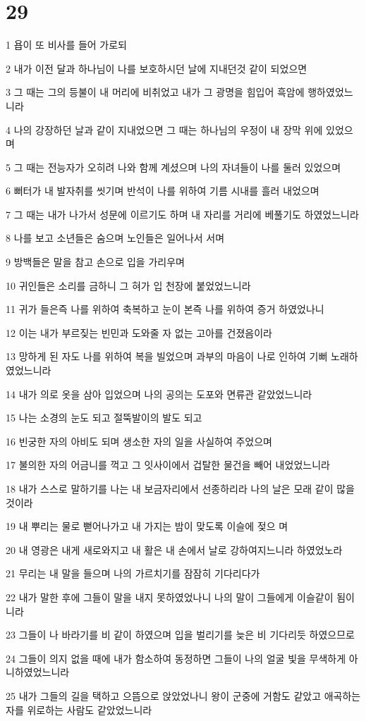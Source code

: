 \chapter{29}

\par 1 욥이 또 비사를 들어 가로되
\par 2 내가 이전 달과 하나님이 나를 보호하시던 날에 지내던것 같이 되었으면
\par 3 그 때는 그의 등불이 내 머리에 비취었고 내가 그 광명을 힘입어 흑암에 행하였었느니라
\par 4 나의 강장하던 날과 같이 지내었으면 그 때는 하나님의 우정이 내 장막 위에 있었으며
\par 5 그 때는 전능자가 오히려 나와 함께 계셨으며 나의 자녀들이 나를 둘러 있었으며
\par 6 뻐터가 내 발자취를 씻기며 반석이 나를 위하여 기름 시내를 흘러 내었으며
\par 7 그 때는 내가 나가서 성문에 이르기도 하며 내 자리를 거리에 베풀기도 하였었느니라
\par 8 나를 보고 소년들은 숨으며 노인들은 일어나서 서며
\par 9 방백들은 말을 참고 손으로 입을 가리우며
\par 10 귀인들은 소리를 금하니 그 혀가 입 천장에 붙었었느니라
\par 11 귀가 들은즉 나를 위하여 축복하고 눈이 본즉 나를 위하여 증거 하였었나니
\par 12 이는 내가 부르짖는 빈민과 도와줄 자 없는 고아를 건졌음이라
\par 13 망하게 된 자도 나를 위하여 복을 빌었으며 과부의 마음이 나로 인하여 기뻐 노래하였었느니라
\par 14 내가 의로 옷을 삼아 입었으며 나의 공의는 도포와 면류관 같았었느니라
\par 15 나는 소경의 눈도 되고 절뚝발이의 발도 되고
\par 16 빈궁한 자의 아비도 되며 생소한 자의 일을 사실하여 주었으며
\par 17 불의한 자의 어금니를 꺽고 그 잇사이에서 겁탈한 물건을 빼어 내었었느니라
\par 18 내가 스스로 말하기를 나는 내 보금자리에서 선종하리라 나의 날은 모래 같이 많을 것이라
\par 19 내 뿌리는 물로 뻗어나가고 내 가지는 밤이 맞도록 이슬에 젖으 며
\par 20 내 영광은 내게 새로와지고 내 활은 내 손에서 날로 강하여지느니라 하였었노라
\par 21 무리는 내 말을 들으며 나의 가르치기를 잠잠히 기다리다가
\par 22 내가 말한 후에 그들이 말을 내지 못하였었나니 나의 말이 그들에게 이슬같이 됨이니라
\par 23 그들이 나 바라기를 비 같이 하였으며 입을 벌리기를 늦은 비 기다리듯 하였으므로
\par 24 그들이 의지 없을 때에 내가 함소하여 동정하면 그들이 나의 얼굴 빛을 무색하게 아니하였었느니라
\par 25 내가 그들의 길을 택하고 으뜸으로 앉았었나니 왕이 군중에 거함도 같았고 애곡하는 자를 위로하는 사람도 같았었느니라

